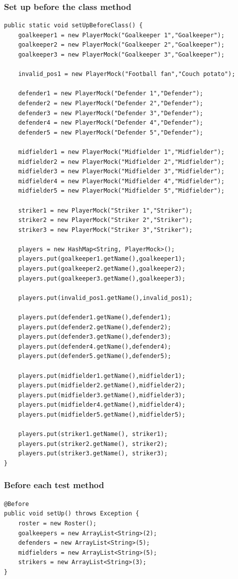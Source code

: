 \documentclass{article}
\begin{document}
\subsubsection*{Set up before the class method}
\begin{lstlisting}
public static void setUpBeforeClass() {
	goalkeeper1 = new PlayerMock("Goalkeeper 1","Goalkeeper");
	goalkeeper2 = new PlayerMock("Goalkeeper 2","Goalkeeper");
	goalkeeper3 = new PlayerMock("Goalkeeper 3","Goalkeeper");
	
	invalid_pos1 = new PlayerMock("Football fan","Couch potato");
	
	defender1 = new PlayerMock("Defender 1","Defender");
	defender2 = new PlayerMock("Defender 2","Defender");
	defender3 = new PlayerMock("Defender 3","Defender");
	defender4 = new PlayerMock("Defender 4","Defender");
	defender5 = new PlayerMock("Defender 5","Defender");
	
	midfielder1 = new PlayerMock("Midfielder 1","Midfielder");
	midfielder2 = new PlayerMock("Midfielder 2","Midfielder");
	midfielder3 = new PlayerMock("Midfielder 3","Midfielder");
	midfielder4 = new PlayerMock("Midfielder 4","Midfielder");
	midfielder5 = new PlayerMock("Midfielder 5","Midfielder");
	
	striker1 = new PlayerMock("Striker 1","Striker");
	striker2 = new PlayerMock("Striker 2","Striker");
	striker3 = new PlayerMock("Striker 3","Striker");
	
	players = new HashMap<String, PlayerMock>();
	players.put(goalkeeper1.getName(),goalkeeper1);
	players.put(goalkeeper2.getName(),goalkeeper2);
	players.put(goalkeeper3.getName(),goalkeeper3);
	
	players.put(invalid_pos1.getName(),invalid_pos1);
	
	players.put(defender1.getName(),defender1);
	players.put(defender2.getName(),defender2);
	players.put(defender3.getName(),defender3);
	players.put(defender4.getName(),defender4);
	players.put(defender5.getName(),defender5);
	
	players.put(midfielder1.getName(),midfielder1);
	players.put(midfielder2.getName(),midfielder2);
	players.put(midfielder3.getName(),midfielder3);
	players.put(midfielder4.getName(),midfielder4);
	players.put(midfielder5.getName(),midfielder5);
	
	players.put(striker1.getName(), striker1);
	players.put(striker2.getName(), striker2);
	players.put(striker3.getName(), striker3);
}
\end{lstlisting}

\subsubsection*{Before each test method}
\begin{lstlisting}
@Before
public void setUp() throws Exception {
	roster = new Roster();
	goalkeepers = new ArrayList<String>(2);
	defenders = new ArrayList<String>(5);
	midfielders = new ArrayList<String>(5);
	strikers = new ArrayList<String>(3);
}
\end{lstlisting}
\end{document}
